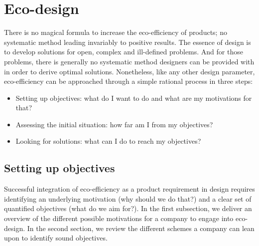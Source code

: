 \documentclass{article}
\begin{document}
\section{Eco-design}
\label{sec:ecodesign}

There is no magical formula to increase the eco-efficiency of products; no systematic method leading invariably to positive results. The essence of design is to develop solutions for open, complex and ill-defined problems. And for those problems, there is generally no systematic method designers can be provided with in order to derive optimal solutions. Nonetheless, like any other design parameter, eco-efficiency can be approached through a simple rational process in three steps:
\begin{itemize}
	\item Setting up objectives: what do I want to do and what are my motivations for that?
	\item Assessing the initial situation: how far am I from my objectives?
	\item Looking for solutions: what can I do to reach my objectives?
\end{itemize}

\subsection{Setting up objectives}
\label{sec:objectives}

Successful integration of eco-efficiency as a product requirement in design requires identifying an underlying motivation (why should we do that?) and a clear set of quantified objectives (what do we aim for?). In the first subsection, we deliver an overview of the different possible motivations for a company to engage into eco-design. In the second section, we review the different schemes a company can lean upon to identify sound objectives.
\end{document}
